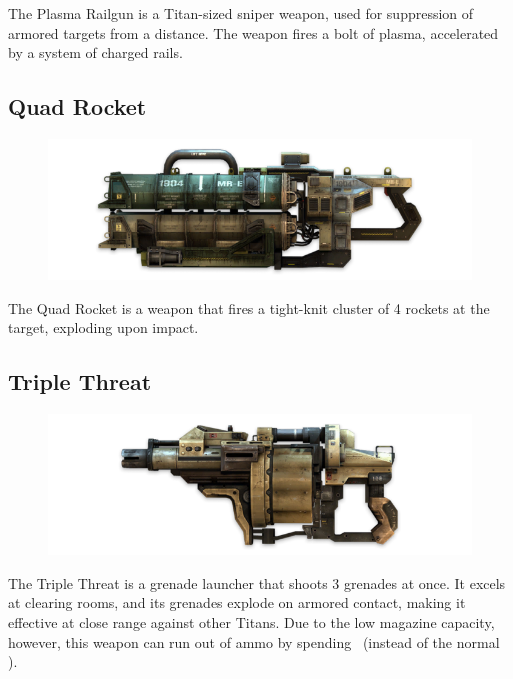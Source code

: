 \documentclass[9pt, openany]{extbook}
\begin{document}
The Plasma Railgun is a Titan-sized sniper weapon, used for suppression of armored targets from a distance. The weapon fires a bolt of plasma, accelerated by a system of charged rails.


\subsection{Quad Rocket}
\begin{figure}
\vspace*{-2em}
\includegraphics[width=\linewidth]{QuadRocket}
\end{figure}

The Quad Rocket is a weapon that fires a tight-knit cluster of 4 rockets at the target, exploding upon impact.

\subsection{Triple Threat}
\begin{figure}
\vspace*{-2em}
\includegraphics[width=\linewidth]{TripleThreat}
\end{figure}

The Triple Threat is a grenade launcher that shoots 3 grenades at once. It excels at clearing rooms, and its grenades explode on armored contact, making it effective at close range against other Titans. Due to the low magazine capacity, however, this weapon can run out of ammo by spending \Threat\Threat\Threat\ (instead of the normal \Despair).
\end{document}
